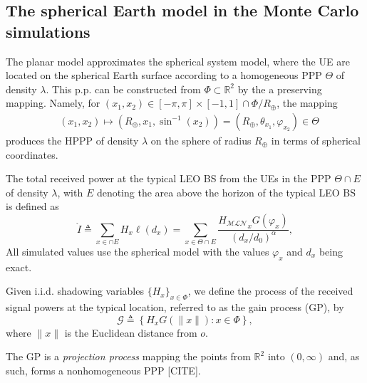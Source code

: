 \documentclass[lettersize,journal]{IEEEtran}
\newcommand{\rEarth}{R_{\oplus}}
\newcommand{\R}{\mathbb{R}}
\begin{document}
\subsection{The spherical Earth model in the Monte Carlo simulations }

\label{sec:sphericalmodel}
The planar model approximates the spherical system model, where the UE are located on the spherical Earth surface according to a homogeneous PPP $\Theta$ of density $\lambda$. This p.p. can be constructed from $\Phi \subset \R^2$ by the a preserving mapping. Namely, for $(x_1,x_2) \in [-\pi,\pi]\times[-1,1]\cap\Phi/\rEarth$, the mapping 
\begin{align}
  &(x_1,x_2)\mapsto (\rEarth,x_1,\sin^{-1}(x_2))=(\rEarth,\theta_{x_1},\varphi_{x_2}) \in \Theta
\end{align}
 produces the HPPP of density $\lambda$ on the sphere of radius $\rEarth$ in terms of spherical coordinates.

The total received power at the typical LEO BS from the UEs in the PPP $\Theta \cap E $ of density $\lambda$, with $E$ denoting the area above the horizon of the typical LEO BS is defined as
\begin{equation}
  \label{eq:mathringptot}
  \mathring{I} \triangleq  \sum_{x \in \cap E } H_x\ell(d_x) = \sum_{x \in \Theta \cap E }  \frac{{H_{\mathcal{M}\mathcal{L}\mathcal{N}}}_x G(\varphi_x)}{(d_x/d_0)^{\alpha}},
\end{equation}
All simulated values use the spherical model with the values $\varphi_x$ and $d_x$ being exact. 


         
Given i.i.d. shadowing variables $\{H_x\}_{x \in \Phi}$, we define the process of the received signal powers at the typical location, referred to as the gain process (GP), by
\begin{equation}
  \label{eq:gainprocess}
  \mathcal{G} \triangleq \left\{ H_x G(\|x\|) : x \in \Phi \right\},
\end{equation}
where $\|x\|$ is the Euclidean distance from $\textit{o}$. 

The GP is a \textit{projection process} mapping the points from $\mathbb{R}^2$ into $(0,\infty)$ and, as such, forms a nonhomogeneous PPP [CITE].
\end{document}
